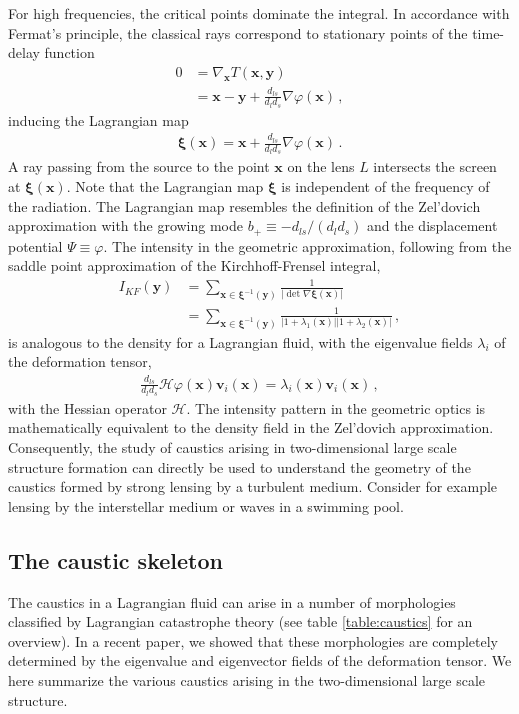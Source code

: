\documentclass[a4paper, 11pt]{article}
\begin{document}
For high frequencies, the critical points dominate the integral. In accordance with Fermat's principle, the classical rays correspond to stationary points of the time-delay function
\begin{align}
0 &= \nabla_{\bm{x}} T(\bm{x},\bm{y})\nonumber\\
&= \bm{x} - \bm{y} + \frac{d_{ls}}{d_ld_s} \nabla \varphi(\bm{x})\,,
\end{align}
inducing the Lagrangian map
\begin{align}
\bm{\xi}(\bm{x}) = \bm{x} + \frac{d_{ls}}{d_ld_s} \nabla \varphi(\bm{x})\,.
\end{align}
A ray passing from the source to the point $\bm{x}$ on the lens $L$ intersects the screen at $\bm{\xi}(\bm{x})$. Note that the Lagrangian map $\bm{\xi}$ is independent of the frequency of the radiation. The Lagrangian map resembles the definition of the Zel'dovich approximation with the growing mode $b_+ \equiv -d_{ls}/(d_l d_s)$ and the displacement potential $\Psi \equiv \varphi$. The intensity in the geometric approximation, following from the saddle point approximation of the Kirchhoff-Frensel integral,
\begin{align}
I_{KF}(\bm{y})
&= \sum_{\bm{x} \in \bm{\xi}^{-1}(\bm{y})} \frac{1}{|\det \nabla \bm{\xi}(\bm{x})|} \nonumber\\
&=\sum_{\bm{x} \in \bm{\xi}^{-1}(\bm{y})} \frac{1}{|1+\lambda_1(\bm{x})||1+\lambda_2(\bm{x})|} \,,
\end{align}
is analogous to the density for a Lagrangian fluid, with the eigenvalue fields $\lambda_i$ of the deformation tensor,
\begin{align}
\frac{d_{ls}}{d_ld_s} \mathcal{H} \varphi(\bm{x}) \bm{v}_i(\bm{x}) = \lambda_i(\bm{x}) \bm{v}_i(\bm{x})\,,
\end{align}
with the Hessian operator $\mathcal{H}$. The intensity pattern in the geometric optics is mathematically equivalent to the density field in the Zel'dovich approximation. Consequently, the study of caustics arising in two-dimensional large scale structure formation can directly be used to understand the geometry of the caustics formed by strong lensing by a turbulent medium. Consider for example lensing by the interstellar medium or waves in a swimming pool.

\subsection{The caustic skeleton}
The caustics in a Lagrangian fluid can arise in a number of morphologies classified by Lagrangian catastrophe theory (see table \ref{table:caustics} for an overview). In a recent paper, we showed that these morphologies are completely determined by the eigenvalue and eigenvector fields of the deformation tensor. We here summarize the various caustics arising in the two-dimensional large scale structure.
\end{document}
